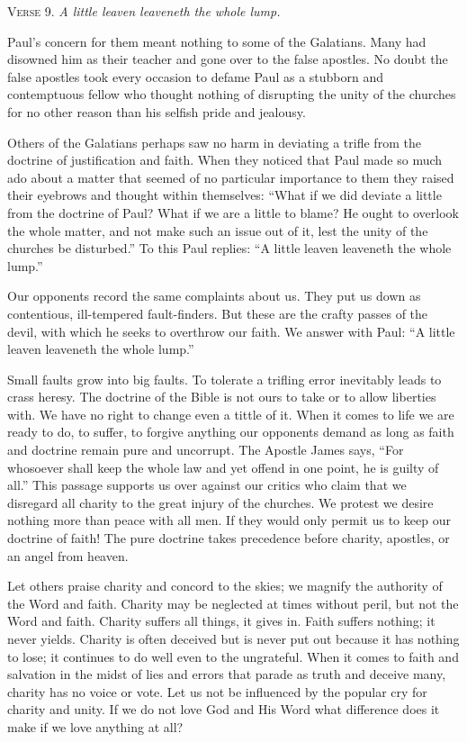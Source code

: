 \textsc{Verse} 9. \emph{A little leaven leaveneth the whole lump.}

Paul’s concern for them meant nothing to some of the Galatians. Many had disowned him as their teacher and gone over to the false apostles. No doubt the false apostles took every occasion to defame Paul as a stubborn and contemptuous fellow who thought nothing of disrupting the unity of the churches for no other reason than his selfish pride and jealousy.

Others of the Galatians perhaps saw no harm in deviating a trifle from the doctrine of justification and faith. When they noticed that Paul made so much ado about a matter that seemed of no particular importance to them they raised their eyebrows and thought within themselves: “What if we did deviate a little from the doctrine of Paul? What if we are a little to blame? He ought to overlook the whole matter, and not make such an issue out of it, lest the unity of the churches be disturbed.” To this Paul replies: “A little leaven leaveneth the whole lump.”

Our opponents record the same complaints about us. They put us down as contentious, ill-tempered fault-finders. But these are the crafty passes of the devil, with which he seeks to overthrow our faith. We answer with Paul: “A little leaven leaveneth the whole lump.”

Small faults grow into big faults. To tolerate a trifling error inevitably leads to crass heresy. The doctrine of the Bible is not ours to take or to allow liberties with. We have no right to change even a tittle of it. When it comes to life we are ready to do, to suffer, to forgive anything our opponents demand as long as faith and doctrine remain pure and uncorrupt. The Apostle James says, “For whosoever shall keep the whole law and yet offend in one point, he is guilty of all.” This passage supports us over against our critics who claim that we disregard all charity to the great injury of the churches. We protest we desire nothing more than peace with all men. If they would only permit us to keep our doctrine of faith! The pure doctrine takes precedence before charity, apostles, or an angel from heaven.

Let others praise charity and concord to the skies; we magnify the authority of the Word and faith. Charity may be neglected at times without peril, but not the Word and faith. Charity suffers all things, it gives in. Faith suffers nothing; it never yields. Charity is often deceived but is never put out because it has nothing to lose; it continues to do well even to the ungrateful. When it comes to faith and salvation in the midst of lies and errors that parade as truth and deceive many, charity has no voice or vote. Let us not be influenced by the popular cry for charity and unity. If we do not love God and His Word what difference does it make if we love anything at all?

